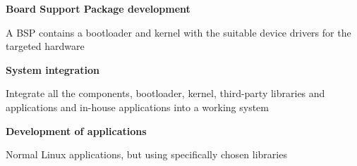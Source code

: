   \startitemize
  \item {\bf Board Support Package development}
    \startitemize
    \item A BSP contains a bootloader and kernel with the suitable
      device drivers for the targeted hardware
    \stopitemize
  \item {\bf System integration}
    \startitemize
    \item Integrate all the components, bootloader, kernel,
      third-party libraries and applications and in-house applications
      into a working system
    \stopitemize
  \item {\bf Development of applications}
    \startitemize
    \item Normal Linux applications, but using specifically chosen
      libraries
    \stopitemize
  \stopitemize

